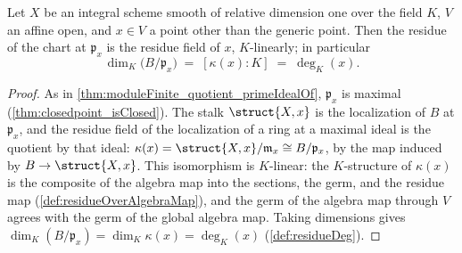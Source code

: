 \begin{theorem}
  \label{thm:finrank_quotient_primeIdealOf}
  \leanok
  Let \(X\) be an integral scheme smooth of relative dimension one over the field
  \(K\), \(V\) an affine open, and \(x \in V\) a point other than the generic point.
  Then the residue of the chart at \(\mathfrak p_x\) is the residue field of \(x\),
  \(K\)-linearly; in particular
  \[
    \dim_K\bigl(B/\mathfrak p_x\bigr) \;=\; [\kappa(x) : K] \;=\; \deg_K(x) .
  \]
\end{theorem}
\begin{proof}
  \leanok
  As in \ref{thm:moduleFinite_quotient_primeIdealOf}, \(\mathfrak p_x\) is maximal
  (\ref{thm:closedpoint_isClosed}). The stalk \(\struct{X,x}\) is the localization of
  \(B\) at \(\mathfrak p_x\), and the residue field of the localization of a ring at a
  maximal ideal is the quotient by that ideal: \(\kappa(x) =
  \struct{X,x}/\mathfrak m_x \cong B/\mathfrak p_x\), by the map induced by
  \(B \to \struct{X,x}\). This isomorphism is \(K\)-linear: the \(K\)-structure of
  \(\kappa(x)\) is the composite of the algebra map into the sections, the germ, and
  the residue map (\ref{def:residueOverAlgebraMap}), and the germ of the algebra map
  through \(V\) agrees with the germ of the global algebra map. Taking dimensions
  gives \(\dim_K(B/\mathfrak p_x) = \dim_K \kappa(x) = \deg_K(x)\)
  (\ref{def:residueDeg}).
\end{proof}

